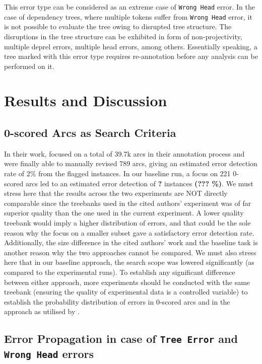 This error type can be considered as an extreme case of \texttt{Wrong Head} error. In the case of dependency trees, where multiple tokens suffer from \texttt{Wrong Head} error, it is not possible to evaluate the tree owing to disrupted tree structure. The disruptions in the tree structure can be exhibited in form of non-projectivity, multiple deprel errors, multiple head errors, among others. Essentially speaking, a tree marked with this error type requires re-annotation before any analysis can be performed on it.

\section{Results and Discussion}
\label{results:lisca}

\subsection{0-scored Arcs as Search Criteria}

In their work, \cite{alzetta2017dangerous} focused on a total of 39.7k arcs in their annotation process and were finally able to manually revised 789 arcs, giving an estimated error detection rate of 2\% from the flagged instances. In our baseline run, a focus on 221 0-scored arcs led to an estimated error detection of \textbf{?} instances \textbf{(??? \%)}. We must stress here that the results across the two experiments are NOT directly comparable since the treebanks used in the cited authors' experiment was of far superior quality than the one used in the current experiment. A lower quality treebank would imply a higher distribution of errors, and that could be the sole reason why the focus on a smaller subset gave a satisfactory error detection rate. Additionally, the size difference in the cited authors' work and the baseline task is another reason why the two approaches cannot be compared. We must also stress here that in our baseline approach, the search scope was lowered significantly (as compared to the experimental runs). To establish any significant difference between either approach, more experiments should be conducted with the same treebank (ensuring the quality of experimental data is a controlled variable) to establish the probability distribution of errors in 0-scored arcs and in the approach as utilised by \citeauthor{alzetta2017dangerous}.

\subsection{Error Propagation in case of \texttt{Tree Error} and \texttt{Wrong Head} errors}
\label{discussion:errorPropagation}

